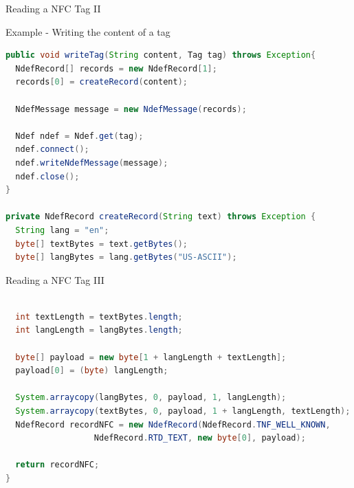 \documentclass{beamer}
\begin{document}
  \begin{frame}{Reading a NFC Tag II}
    \begin{exampleblock}{Example - Writing the content of a tag}
      \begin{lstlisting}[language=Java]	
public void writeTag(String content, Tag tag) throws Exception{
  NdefRecord[] records = new NdefRecord[1];
  records[0] = createRecord(content);
  
  NdefMessage message = new NdefMessage(records);
  
  Ndef ndef = Ndef.get(tag);
  ndef.connect();
  ndef.writeNdefMessage(message);
  ndef.close();
}

private NdefRecord createRecord(String text) throws Exception {
  String lang = "en";
  byte[] textBytes = text.getBytes();
  byte[] langBytes = lang.getBytes("US-ASCII");
      \end{lstlisting}
    \end{exampleblock}
  \end{frame}

  \begin{frame}{Reading a NFC Tag III}
    \begin{exampleblock}{\vspace{-10pt}}
      \begin{lstlisting}[language=Java]
      
  int textLength = textBytes.length;
  int langLength = langBytes.length;

  byte[] payload = new byte[1 + langLength + textLength];
  payload[0] = (byte) langLength;

  System.arraycopy(langBytes, 0, payload, 1, langLength);
  System.arraycopy(textBytes, 0, payload, 1 + langLength, textLength);
  NdefRecord recordNFC = new NdefRecord(NdefRecord.TNF_WELL_KNOWN, 
                  NdefRecord.RTD_TEXT, new byte[0], payload);
  
  return recordNFC;
}
      \end{lstlisting}
    \end{exampleblock}
  \end{frame}
\end{document}
